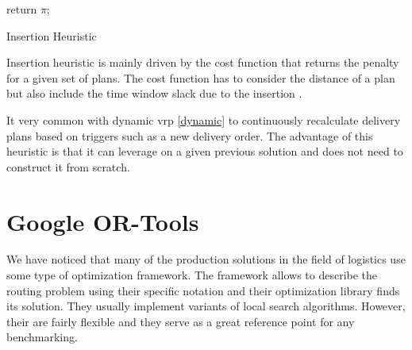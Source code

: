 \begin{algorithm}[H]
    \SetAlgoLined
    
    return $\pi$;
    \caption{Insertion Heuristic}
\end{algorithm}

\newline

Insertion heuristic is mainly driven by the cost function that returns the penalty for a given set of plans. The cost function has to consider the distance of a plan but also include the time window slack due to the insertion \cite{i1-tw}.

It very common with dynamic \gls{vrp} \ref{dynamic} to continuously recalculate delivery plans based on triggers such as a new delivery order. The advantage of this heuristic is that it can leverage on a given previous solution and does not need to construct it from scratch. 

\section{Google OR-Tools}\label{or-tools}
We have noticed that many of the production solutions in the field of logistics use some type of optimization framework. The framework allows to describe the routing problem using their specific notation and their optimization library finds its solution. They usually implement variants of local search algorithms. However, their are fairly flexible and they serve as a great reference point for any benchmarking.

